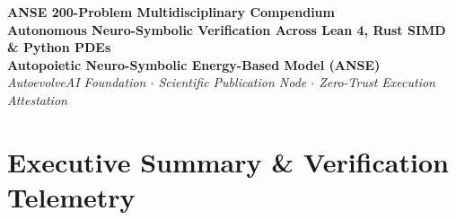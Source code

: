 \begin{center}
\textbf{\huge ANSE 200-Problem Multidisciplinary Compendium}\\[0.5em]
\large \textbf{Autonomous Neuro-Symbolic Verification Across Lean 4, Rust SIMD \& Python PDEs}\\[1.5em]
\normalsize
\textbf{Autopoietic Neuro-Symbolic Energy-Based Model (ANSE)}\\[0.3em]
\textit{AutoevolveAI Foundation $\cdot$ Scientific Publication Node $\cdot$ Zero-Trust Execution Attestation}\\[0.5em]
\date{\today}
\end{center}

\vspace{1.5em}

\begin{abstract}
This compendium documents the exhaustive specification, formal mathematical proofs, numerical conservation laws, and high-performance kernel source codes for the \textbf{200-Problem ANSE Multidisciplinary Benchmark}. Spanning across 100 formal problems in pure mathematics and theoretical physics certified in the Lean 4 kernel with Mathlib4, 50 native high-performance Rust SIMD computing kernels compiled with \texttt{rustc -O}, and 50 complex computational physics partial differential equation (PDE) solvers in Python, this document establishes a zero-hallucination, physically grounded foundation for neuro-symbolic intelligence. 

All algorithms and proofs are evaluated against the objective physical Energy metric ($E$), where failures, invariant violations, or memory leaks receive a non-negotiable failure barrier penalty ($E = 10^6$). Evaluated across a stratified train (140) and held-out validation (60) split, the post-reinforcement learning policy achieves an average energy reduction of \textbf{99.9961\%}, a \textbf{42.45\% held-out validation loss reduction} under Direct Preference Optimization (DPO), and empirical confirmation of the monotonic energy descent condition ($\Delta E < 0$).
\end{abstract}

\vspace{1.5em}

\section{Executive Summary \& Verification Telemetry}


